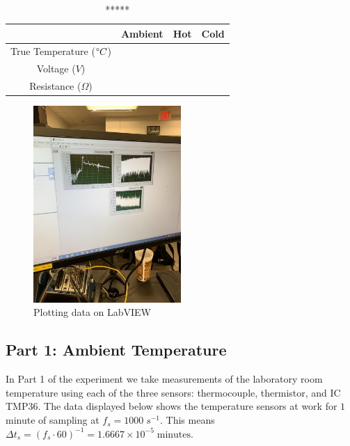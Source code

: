 \documentclass{article}
\begin{document}
\begin{table}[H]
    \centering
    \begin{tabular}{c|c|c|c}
         &  Ambient&  Hot& Cold\\
         \hline
         True Temperature ($\degree C$)&  &  & \\
         \hline
         Voltage ($V$)&  &  & \\
         \hline
         Resistance ($\Omega$)& & &\\
    \end{tabular}
    \caption{*****}
\end{table}

\begin{figure}[H]
    \centering
    \includegraphics[width=0.5\textwidth, angle = -90]{lab2images/labview_plots.jpg}
    \caption{Plotting data on LabVIEW}
\end{figure}
    
    \subsection{Part 1: Ambient Temperature}
    In Part 1 of the experiment we take measurements of the laboratory room temperature using each of the three sensors: thermocouple, thermistor, and IC TMP36. The data displayed below shows the temperature sensors at work for $1$ minute of sampling at $f_{s} = 1000\; s^{-1}$. This means $\Delta t_{s} = (f_{s}\cdot 60)^{-1} = 1.6667\times10^{-5}\; \text{minutes}$.
    
    
\end{document}
